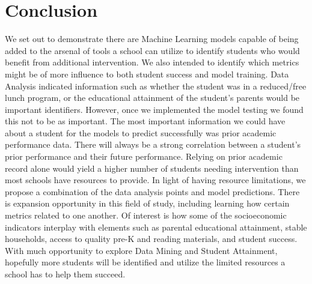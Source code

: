 \documentclass[doc]{apa6} %
\begin{document}
\section{Conclusion}
We set out to demonstrate there are Machine Learning models capable of being added to the arsenal of tools a school can utilize to identify students who would benefit from additional intervention. We also intended to identify which metrics might be of more influence to both student success and model training.
Data Analysis indicated information such as whether the student was in a reduced/free lunch program, or the educational attainment of the student's parents would be important identifiers.  However, once we implemented the model testing we found this not to be as important. The most important information we could have about a student for the models to predict successfully was prior academic performance data.
There will always be a strong correlation between a student's prior performance and their future performance. Relying on prior academic record alone would yield a higher number of students needing intervention than most schools have resources to provide. In light of having resource limitations, we propose a combination of the data analysis points and model predictions. There is expansion opportunity in this field of study, including learning how certain metrics related to one another. Of interest is how some of the socioeconomic indicators interplay with elements such as parental educational attainment, stable households, access to quality pre-K and reading materials, and student success. 
With much opportunity to explore Data Mining and Student Attainment, hopefully more students will be identified and utilize the limited resources a school has to help them succeed. 

\end{document}
